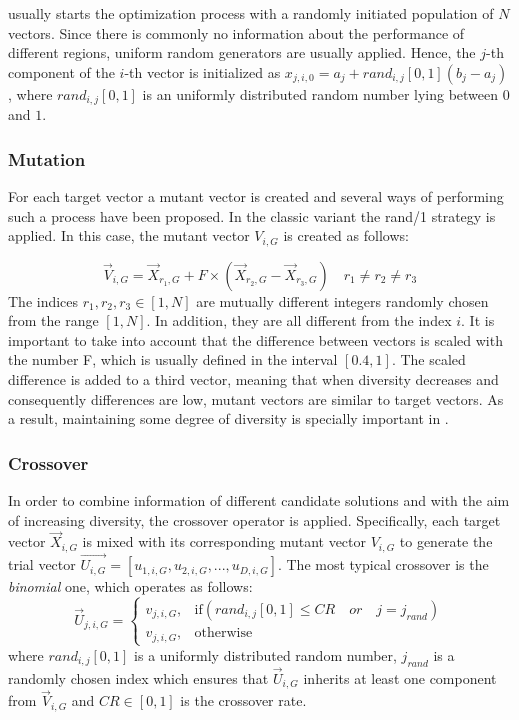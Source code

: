 \DE{} usually starts the optimization process with a randomly initiated population of $N$ vectors.
%
Since there is commonly no information about the performance of different regions, uniform random generators are usually applied.
%
Hence, the $j$-th component of the $i$-th vector is initialized as $x_{j,i,0} = a_{j} + rand_{i,j}[0,1] (b_{j} - a_{j})$,
where $rand_{i,j}[0,1]$ is an uniformly distributed random number lying between $0$ and $1$.

\subsubsection{Mutation}

For each target vector a mutant vector is created and several ways of performing
such a process have been proposed.
%
In the classic \DE{} variant the rand/1 strategy is applied.
%
In this case, the mutant vector $V_{i,G}$ is created as follows:

\begin{equation}\label{eqn:mutation}
\vec{V}_{i,G} = \vec{X}_{r_1, G} + F \times (\vec{X}_{r_2, G} - \vec{X}_{r_3, G}) \quad r_1 \neq r_2 \neq r_3
\end{equation}
%
The indices $r_1, r_2, r_3 \in [1,N]$ are mutually different integers randomly chosen from the range $[1, N]$.
%
In addition, they are all different from the index $i$.
%
It is important to take into account that the difference between vectors is scaled with the number F, which is usually defined in the interval $[0.4, 1]$.
%
The scaled difference is added to a third vector, meaning that
when diversity decreases and consequently differences are low, mutant vectors are similar to target vectors.
%
As a result, maintaining some degree of diversity is specially important in \DE{}.

\subsubsection{Crossover}

In order to combine information of different candidate solutions and with the aim of increasing diversity, the crossover
operator is applied.
%
Specifically, each target vector $\vec{X}_{i,G}$ is mixed with its corresponding mutant vector $V_{i,G}$ to 
generate the trial vector $\vec{U_{i,G}} = [u_{1,i,G},u_{2,i,G}, ..., u_{D,i,G} ]$.
%
The most typical crossover is the \textit{binomial} one, which operates as follows:
%
\begin{equation} \label{eqn:crossover}
\vec{U}_{j,i,G}= 
\begin{cases}
    v_{j,i,G},& \text{if} (rand_{i,j}[0,1] \leq CR \quad or \quad j = j_{rand}  )\\
    v_{j,i,G},              & \text{otherwise}
\end{cases}
\end{equation}
where $rand_{i,j}[0,1]$ is a uniformly distributed random number,
$j_{rand}$ is a randomly chosen index which ensures that $\vec{U}_{i,G}$ inherits at least one component from $\vec{V}_{i,G}$ and
$CR \in [0,1]$ is the crossover rate.


